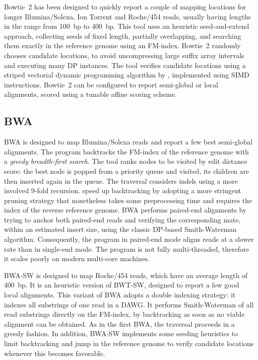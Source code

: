 Bowtie~2 \citep{Langmead2012} has been designed to quickly report a couple of mapping locations for longer Illumina/Solexa, Ion Torrent and Roche/454 reads, usually having lengths in the range from 100~bp to 400~bp.
This tool uses an heuristic seed-and-extend approach, collecting seeds of fixed length, partially overlapping, and searching them exactly in the reference genome using an FM-index.
Bowtie~2 randomly chooses candidate locations, to avoid uncompressing large suffix array intervals and executing many DP instances.
The tool verifies candidate locations using a striped vectorial dynamic programming algorithm by \citep{Farrar2007}, implemented using SIMD instructions.
Bowtie~2 can be configured to report semi-global or local alignments, scored using a tunable affine scoring scheme.


\subsection{BWA}
\label{background:mappers:bwa}

BWA \citep{Li2009} is designed to map Illumina/Solexa reads and report a few best semi-global alignments.
The program backtracks the FM-index of the reference genome with a \emph{greedy breadth-first search}.
The tool ranks nodes to be visited by edit distance score: the best node is popped from a priority queue and visited, its children are then inserted again in the queue.
The traversal considers indels using a more involved 9-fold recursion.
\citeauthor{Li2009} speed up backtracking by adopting a more stringent pruning strategy \citep{Maekinen2010} that nonetheless takes some preprocessing time and requires the index of the reverse reference genome.
BWA performs paired-end alignments by trying to anchor both paired-end reads and verifying the corresponding mate, within an estimated insert size, using the classic DP-based Smith-Waterman algorithm.
Consequently, the program in paired-end mode aligns reads at a slower rate than in single-end mode.
The program is not fully multi-threaded, therefore it scales poorly on modern multi-core machines.

BWA-SW \citep{Li2010a} is designed to map Roche/454 reads, which have an average length of 400~bp.
It is an heuristic version of BWT-SW, designed to report a few good local alignments.
This variant of BWA adopts a double indexing strategy: it indexes all substrings of one read in a DAWG.
It performs Smith-Waterman of all read substrings directly on the FM-index, by backtracking as soon as no viable alignment can be obtained.
As in the first BWA, the traversal proceeds in a greedy fashion.
In addition, BWA-SW implements some seeding heuristics to limit backtracking and jump in the reference genome to verify candidate locations whenever this becomes favorable.

